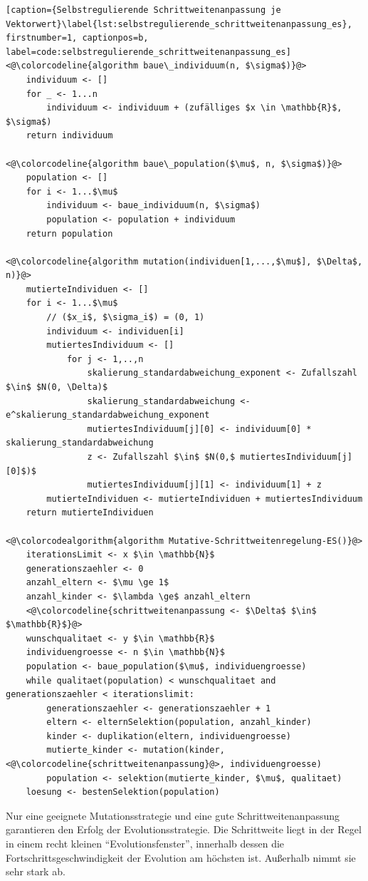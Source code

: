 \begin{lstlisting}[caption={Selbstregulierende Schrittweitenanpassung je Vektorwert}\label{lst:selbstregulierende_schrittweitenanpassung_es}, firstnumber=1, captionpos=b, label=code:selbstregulierende_schrittweitenanpassung_es]
<@\colorcodeline{algorithm baue\_individuum(n, $\sigma$)}@>
	individuum <- []
	for _ <- 1...n
		individuum <- individuum + (zufälliges $x \in \mathbb{R}$, $\sigma$)
	return individuum
	
<@\colorcodeline{algorithm baue\_population($\mu$, n, $\sigma$)}@>
	population <- []
	for i <- 1...$\mu$
		individuum <- baue_individuum(n, $\sigma$)
		population <- population + individuum
	return population

<@\colorcodeline{algorithm mutation(individuen[1,...,$\mu$], $\Delta$, n)}@>
	mutierteIndividuen <- []
	for i <- 1...$\mu$
		// ($x_i$, $\sigma_i$) = (0, 1)
		individuum <- individuen[i]
		mutiertesIndividuum <- []
			for j <- 1,..,n
				skalierung_standardabweichung_exponent <- Zufallszahl $\in$ $N(0, \Delta)$
				skalierung_standardabweichung <- e^skalierung_standardabweichung_exponent
				mutiertesIndividuum[j][0] <- individuum[0] * skalierung_standardabweichung
				z <- Zufallszahl $\in$ $N(0,$ mutiertesIndividuum[j][0]$)$
				mutiertesIndividuum[j][1] <- individuum[1] + z
		mutierteIndividuen <- mutierteIndividuen + mutiertesIndividuum
	return mutierteIndividuen

<@\colorcodealgorithm{algorithm Mutative-Schrittweitenregelung-ES()}@>
	iterationsLimit <- x $\in \mathbb{N}$
	generationszaehler <- 0
	anzahl_eltern <- $\mu \ge 1$
	anzahl_kinder <- $\lambda \ge$ anzahl_eltern
	<@\colorcodeline{schrittweitenanpassung <- $\Delta$ $\in$ $\mathbb{R}$}@>
	wunschqualitaet <- y $\in \mathbb{R}$
	individuengroesse <- n $\in \mathbb{N}$
	population <- baue_population($\mu$, individuengroesse)
	while qualitaet(population) < wunschqualitaet and generationszaehler < iterationslimit:
		generationszaehler <- generationszaehler + 1
		eltern <- elternSelektion(population, anzahl_kinder)
		kinder <- duplikation(eltern, individuengroesse)
		mutierte_kinder <- mutation(kinder, <@\colorcodeline{schrittweitenanpassung}@>, individuengroesse)
		population <- selektion(mutierte_kinder, $\mu$, qualitaet)
	loesung <- bestenSelektion(population)
\end{lstlisting}

Nur eine geeignete Mutationsstrategie und eine gute Schrittweitenanpassung garantieren den Erfolg der Evolutionsstrategie.
Die Schrittweite liegt in der Regel in einem recht kleinen \enquote{Evolutionsfenster}, innerhalb dessen die Fortschrittsgeschwindigkeit der Evolution am höchsten ist. Außerhalb nimmt sie sehr stark ab.
